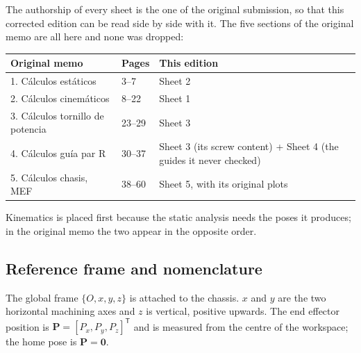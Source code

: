 \documentclass[11pt]{article}
\begin{document}
The authorship of every sheet is the one of the original submission, so that this
corrected edition can be read side by side with it. The five sections of the original memo
are all here and none was dropped:

\begin{center}\small
\begin{tabular}{@{}ll l@{}}
\toprule
\textbf{Original memo} & \textbf{Pages} & \textbf{This edition} \\
\midrule
1. C\'alculos est\'aticos        & 3--7   & Sheet 2 \\
2. C\'alculos cinem\'aticos      & 8--22  & Sheet 1 \\
3. C\'alculos tornillo de potencia & 23--29 & Sheet 3 \\
4. C\'alculos gu\'ia par R       & 30--37 & Sheet 3 (its screw content) + Sheet 4 (the guides it never checked) \\
5. C\'alculos chasis, MEF        & 38--60 & Sheet 5, with its original plots \\
\bottomrule
\end{tabular}
\end{center}

Kinematics is placed first because the static analysis needs the poses it produces; in the
original memo the two appear in the opposite order.

\subsection{Reference frame and nomenclature}

The global frame $\{O,x,y,z\}$ is attached to the chassis. $x$ and $y$ are the two
horizontal machining axes and $z$ is vertical, positive upwards. The end effector
position is $\bm{P}=[P_x,P_y,P_z]^{\mathsf T}$ and is measured from the centre of the
workspace; the home pose is $\bm P = \bm 0$.
\end{document}
